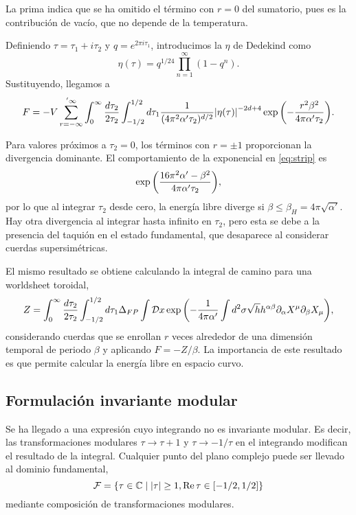 La prima indica que se ha omitido el término con $r=0$ del sumatorio, pues es la contribución
de vacío, que no depende de la temperatura.

Definiendo $\tau=\tau_1+i\tau_2$ y $q=e^{2\pi i\tau_1}$, introducimos la $\eta$ de 
Dedekind como
\begin{equation}
  \eta(\tau)=q^{1/24}\prod_{n=1}^{\infty} (1-q^n).
\end{equation}
Sustituyendo, llegamos a 
\begin{equation}
  F=-V \sum_{r=-\infty}^{'\infty} \int_0^\infty\frac{d\tau_2}{2\tau_2} \int_{-1/2}^{1/2} d\tau_1  \frac{1}{(4\pi^2\alpha'\tau_2)^{d/2}}
  \abs{\eta(\tau)}^{-2d+4}\exp\qty(-\frac{r^2\beta^2}{4\pi\alpha'\tau_2}).
  \label{eq:strip}
\end{equation}

Para valores próximos a $\tau_2=0$, los términos con $r=\pm 1$ proporcionan la divergencia 
dominante.
El comportamiento de la exponencial en \ref{eq:strip} es
\begin{equation}
  \exp\qty(\frac{16\pi^2 \alpha' -\beta^2}{4\pi\alpha'\tau_2}),
\end{equation}
por lo que al integrar $\tau_2$ desde cero, la energía libre diverge si $\beta\leq \beta_H=4\pi\sqrt{\alpha'}$.
Hay otra divergencia al integrar hasta infinito en $\tau_2$, pero esta se debe a la presencia 
del taquión en el estado fundamental, que desaparece al considerar cuerdas supersimétricas.

El mismo resultado se obtiene calculando la integral de camino para una worldsheet toroidal,
\begin{equation}
  Z= \int_0^\infty\frac{d\tau_2}{2\tau_2} \int_{-1/2}^{1/2} d\tau_1 \Delta_{FP} \int \mathcal Dx
  \exp\qty(-\frac{1}{4\pi\alpha'}\int d^2\sigma \sqrt h h^{\alpha\beta}\partial_\alpha X^\mu \partial_\beta X_\mu),
\end{equation}
considerando cuerdas que se enrollan $r$ veces alrededor de una dimensión temporal de periodo $\beta$
y aplicando $F=-Z/\beta$.
La importancia de este resultado es que permite calcular la energía libre en espacio curvo.

\subsection{Formulación invariante modular}
\label{sec:taq}
Se ha llegado a una expresión cuyo integrando no es invariante modular. Es decir, las
transformaciones modulares $\tau\to\tau+1$ y $\tau\to-1/\tau$ en el integrando modifican el resultado
de la integral.
Cualquier punto del plano complejo puede ser llevado al dominio fundamental,
\begin{equation}
  \mathcal F = \qty{ \tau \in \mathbb{C} \mid \abs{\tau} \geq 1, \Re\tau \in [-1/2,1/2]}
\end{equation}
mediante composición de transformaciones modulares.

